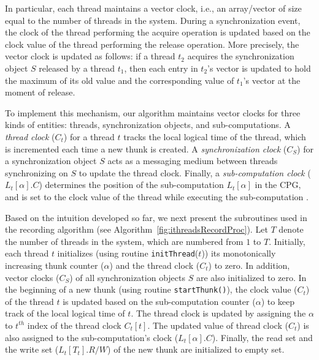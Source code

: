 In particular, each thread maintains a vector clock, i.e., an array/vector of size equal to the number of threads in the system.  
During a synchronization event, the clock of the thread performing the
acquire operation is updated based on the clock value of the thread performing
the release operation.  More precisely, the vector clock is updated as follows: if a thread $t_2$ acquires the synchronization
object $S$ released by a thread $t_1$, then each entry in $t_2$'s vector is
updated to hold the maximum of its old value and the corresponding value of
$t_1$'s vector at the moment of release.



To implement this mechanism, our algorithm maintains vector clocks for three kinds of
entities: threads,  synchronization objects, and sub-computations.  A {\em thread clock}
($C_t$) for a thread $t$ tracks the local logical time of the thread, which is
incremented each time a new thunk is created. A {\em synchronization clock}
($C_S$) for a synchronization object $S$ acts as a messaging medium  between
threads synchronizing on $S$ to update the thread clock. Finally, a {\em  sub-computation clock}
($L_t[\alpha].C$) determines the position of the sub-computation $L_t[\alpha]$
in the CPG, and is set to the clock value of the thread while executing the
sub-computation . 



Based on the intuition developed so far, we next present the
subroutines used in the recording algorithm (see
Algorithm~\ref{fig:ithreadsRecordProc}). Let $T$ denote the number of threads in the system, which are numbered from $1$ to $T$.  Initially, each thread $t$ initializes (using routine {\tt initThread}($t$)) its monotonically increasing thunk
counter ($\alpha$) and the thread clock ($C_t$) to zero. In addition, vector clocks ($C_S$) of all synchronization objects $S$ are also initialized to zero. 
In the beginning of a new thunk (using routine {\tt startThunk()}), the clock value ($C_t$) of the thread $t$ is
updated based on the sub-computation  counter ($\alpha$) to keep track of the local logical time of $t$. The thread clock is updated by assigning the $\alpha$ to $t^{th}$ index of the thread clock $C_t[t]$. The updated value of thread clock ($C_t$)   is also assigned to the sub-computation's clock ($L_t[\alpha].C$). Finally, the read set and the write set
($L_t[T_t].R/W$) of the new thunk are initialized to empty set.

